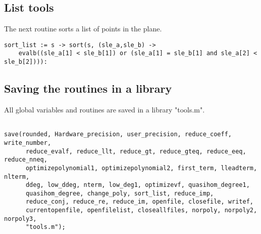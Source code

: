 \documentclass[a4paper,10pt]{article}
\begin{document}
\subsection{List tools}

The next routine sorts a list of points in the plane.

\begin{lstlisting}[name=tools]
sort_list := s -> sort(s, (sle_a,sle_b) ->
    evalb((sle_a[1] < sle_b[1]) or (sle_a[1] = sle_b[1] and sle_a[2] < sle_b[2]))):
\end{lstlisting}

\subsection{Saving the routines in a library}

All global variables and routines are saved in a library "tools.m".

\begin{lstlisting}[name=tools]

save(rounded, Hardware_precision, user_precision, reduce_coeff, write_number,
      reduce_evalf, reduce_llt, reduce_gt, reduce_gteq, reduce_eeq, reduce_nneq,
      optimizepolynomial1, optimizepolynomial2, first_term, lleadterm, nlterm,
      ddeg, low_ddeg, nterm, low_deg1, optimizevf, quasihom_degree1,
      quasihom_degree, change_poly, sort_list, reduce_imp,
      reduce_conj, reduce_re, reduce_im, openfile, closefile, writef,
      currentopenfile, openfilelist, closeallfiles, norpoly, norpoly2, norpoly3,
      "tools.m");
\end{lstlisting}
\end{document}

